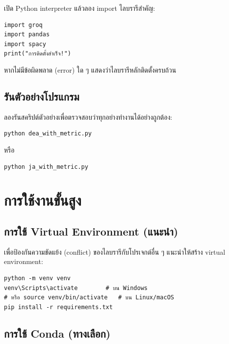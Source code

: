 เปิด Python interpreter แล้วลอง import ไลบรารีสำคัญ:

\begin{lstlisting}[style=python]
import groq
import pandas
import spacy
print("การติดตั้งสำเร็จ!")
\end{lstlisting}

\noindent หากไม่มีข้อผิดพลาด (error) ใด ๆ แสดงว่าไลบรารีหลักติดตั้งครบถ้วน

\subsection{รันตัวอย่างโปรแกรม}
\label{subsec:test-run}

ลองรันสคริปต์ตัวอย่างเพื่อตรวจสอบว่าทุกอย่างทำงานได้อย่างถูกต้อง:

\begin{lstlisting}[style=bash]
python dea_with_metric.py
\end{lstlisting}

\noindent หรือ

\begin{lstlisting}[style=bash]
python ja_with_metric.py
\end{lstlisting}

\section{การใช้งานขั้นสูง}
\label{sec:advanced-usage}

\subsection{การใช้ Virtual Environment (แนะนำ)}
\label{subsec:venv}

เพื่อป้องกันความขัดแย้ง (conflict) ของไลบรารีกับโปรเจกต์อื่น ๆ แนะนำให้สร้าง virtual environment:

\begin{lstlisting}[style=bash]
python -m venv venv
venv\Scripts\activate        # บน Windows
# หรือ source venv/bin/activate   # บน Linux/macOS
pip install -r requirements.txt
\end{lstlisting}

\subsection{การใช้ Conda (ทางเลือก)}
\label{subsec:conda}

